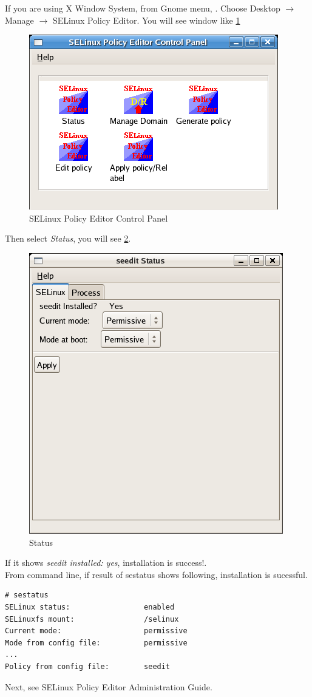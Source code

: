 \documentclass{article}
\begin{document}
If you are using X Window System,  from  Gnome menu, 
. Choose Desktop $\rightarrow$ Manage $\rightarrow$ SELinux
Policy Editor.
You will see window like \ref{fig:controlpanel}
\begin{figure}
\caption{SELinux Policy Editor Control Panel}\label{fig:controlpanel}
\includegraphics*{images/controlpanel.png}
\end{figure}

Then  select {\it Status}, you will see \ref{fig:status-selinux}.
\begin{figure}
\caption{Status}\label{fig:status-selinux}
\includegraphics{images/status-selinux.png}
\end{figure}
If it shows {\it seedit installed: yes}, installation is success!.\\

From command line, if result of sestatus shows following, installation
is sucessful.
\begin{verbatim}
# sestatus
SELinux status:                 enabled
SELinuxfs mount:                /selinux
Current mode:                   permissive
Mode from config file:          permissive
...
Policy from config file:        seedit	
\end{verbatim}

Next,  see SELinux Policy Editor Administration Guide.
\end{document}
